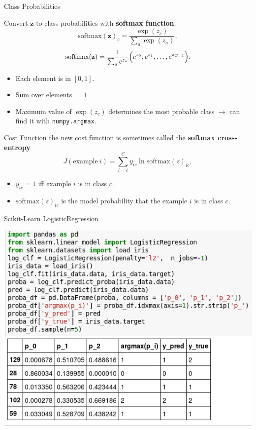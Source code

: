 \documentclass[12pt,t]{beamer}
\begin{document}
\begin{frame}{Class Probabilities}

Convert $\mathbf{z}$ to class probabilities with {\bf softmax function}:
$$ \text{softmax}(\mathbf{z})_c = \frac{\exp(z_c)}{\sum_a \exp(z_a)}, $$
$$ \text{softmax}(\mathbf{z}) = \frac{1}{\sum_a e^{z_a}} \Bigl(e^{z_0}, e^{z_1}, \ldots, e^{z_{C-1}}\Bigr). $$

\begin{itemize}
\item Each element is in $[0,1]$.
\item Sum over  elements $=1$
\item Maximum value of $\exp(z_c)$ determines the most probable class $\rightarrow$ can find it with \texttt{numpy.argmax}.
\end{itemize}
\end{frame}

\begin{frame}{Cost Function}
the new cost function is sometimes called the {\bf softmax cross-entropy}
$$
J (\text{example}~i) = \sum_{i=c}^C y_{ic}   \ln \text{softmax}(z)_{ic},
$$
\begin{itemize}
\item $y_{ic} = 1$ iff example $i$ is in class $c$. \\
\item $\text{softmax}(z)_{ic}$ is the model probability that  the example $i$ is in class $c$.
\end{itemize} 
\end{frame}

\begin{frame}{Scikit-Learn LogisticRegression}

\centerline{
\includegraphics[height=0.8\textheight]{Log_proba.png}
}
\end{frame}
\end{document}
